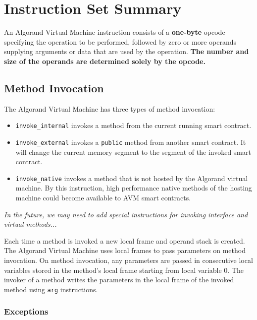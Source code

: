 \documentclass[11pt, A4]{report}
\begin{document}
    \section{Instruction Set Summary}\label{sec:instruction-set-summary}

    An Algorand Virtual Machine instruction consists of a \textbf{one-byte} opcode specifying the operation to be
    performed, followed by zero or more operands supplying arguments or data that are used by the operation.
    \textbf{The number and size of the operands are determined solely by the opcode.}

    \subsection{Method Invocation}\label{subsec:method-invocation}

    The Algorand Virtual Machine has three types of method invocation:
    \begin{itemize}
        \item \texttt{invoke\_internal} invokes a method from the current running smart contract.
        \item \texttt{invoke\_external} invokes a \texttt{public} method from another smart contract. It will change
        the current memory segment to the segment of the invoked smart contract.
        \item \texttt{invoke\_native} invokes a method that is not hosted by the Algorand virtual machine. By this
        instruction, high performance native methods of the hosting machine could become available to AVM smart
        contracts.
    \end{itemize}

    \emph{In the future, we may need to add special instructions for invoking interface and virtual methods...}

    Each time a method is invoked a new local frame and operand stack is created. The Algorand Virtual Machine uses
    local frames to pass parameters on method invocation. On method invocation, any parameters are passed in
    consecutive local variables stored in the method's local frame starting from local variable 0. The invoker of a
    method writes the parameters in the local frame of the invoked method using \texttt{arg} instructions.

    \subsubsection{Exceptions}
\end{document}
